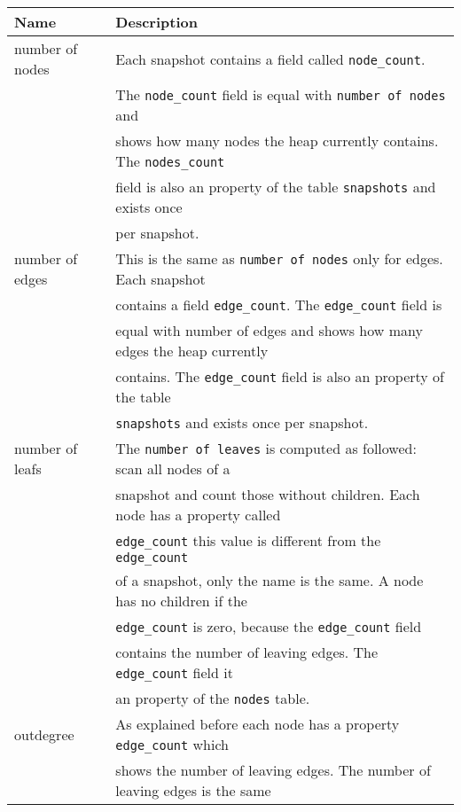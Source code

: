 		\begin{table}[!htbp]
			\centering
			\begin{tabular}{|l||l|}
				\hline
				\textbf{Name}	&	\textbf{Description}														\\ \hline \hline
				number of nodes & 	Each snapshot contains a field called \texttt{node\_count}. 				\\
								&	The \texttt{node\_count} field is equal with \texttt{number of nodes} and 	\\
								&	shows how many nodes the heap currently contains. The \texttt{nodes\_count} \\
								&	field is also an property of the table \texttt{snapshots} and exists once 	\\
								&	per snapshot.																\\ \hline
				number of edges	&	This is the same as \texttt{number of nodes} only for edges. Each snapshot 	\\
								&	contains a field \texttt{edge\_count}. The \texttt{edge\_count} field is 	\\
								&	equal with number of edges and shows how many edges the heap currently 		\\
								&	contains. The \texttt{edge\_count} field is also an property of the table 	\\
								&	\texttt{snapshots} and exists once per snapshot.							\\ \hline
				number of leafs	&	The \texttt{number of leaves} is computed as followed: scan all nodes of a 	\\
								&	snapshot and count those without children. Each node has a property called 	\\
								&	\texttt{edge\_count} this value is different from the \texttt{edge\_count} 	\\
								&	of a snapshot, only the name is the same. A node has no children if the 	\\
								&	\texttt{edge\_count} is zero, because the \texttt{edge\_count} field 		\\
								&	contains the number of leaving edges. The \texttt{edge\_count} field it 	\\
								&	an property of the \texttt{nodes} table.									\\ \hline
				outdegree		&	As explained before each node has a property \texttt{edge\_count} which 	\\
								&	shows the number of leaving edges. The number of leaving edges is the same 	\\

\end{tabular}
\end{table}
